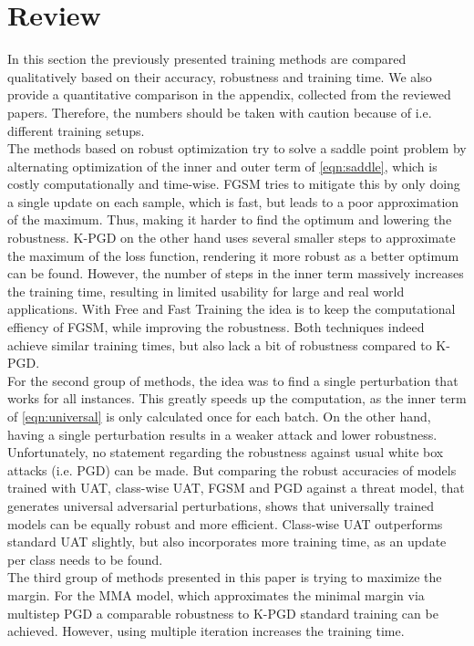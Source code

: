 \documentclass{article}
\begin{document}
\section{Review} \label{rev}
In this section the previously presented training methods are compared qualitatively based on their accuracy, robustness and training time. We also provide a quantitative comparison in the appendix, collected from the reviewed papers. Therefore, the numbers should be taken with caution because of i.e. different training setups. \\
The methods based on robust optimization try to solve a saddle point problem by alternating optimization of the inner and outer term of \ref{eqn:saddle}, which is costly computationally and time-wise. FGSM tries to mitigate this by only doing a single update on each sample, which is fast, but leads to a poor approximation of the maximum. Thus, making it harder to find the optimum and lowering the robustness. K-PGD on the other hand uses several smaller steps to approximate the maximum of the loss function, rendering it more robust as a better optimum can be found. However, the number of steps in the inner term massively increases the training time, resulting in limited usability for large and real world applications. With Free and Fast Training the idea is to keep the computational effiency of FGSM, while improving the robustness. Both techniques indeed achieve similar training times, but also lack a bit of robustness compared to K-PGD. \\
For the second group of methods, the idea was to find a single perturbation that works for all instances. This greatly speeds up the computation, as the inner term of \ref{eqn:universal} is only calculated once for each batch. On the other hand, having a single perturbation results in a weaker attack and lower robustness. Unfortunately, no statement regarding the robustness against usual white box attacks (i.e. PGD) can be made. But comparing the robust accuracies of models trained with UAT, class-wise UAT, FGSM and PGD against a threat model, that generates universal adversarial perturbations, shows that universally trained models can be equally robust and more efficient. Class-wise UAT outperforms standard UAT slightly, but also incorporates more training time, as an update per class needs to be found. \\
The third group of methods presented in this paper is trying to maximize the margin. For the MMA model, which approximates the minimal margin via multistep PGD a comparable robustness to K-PGD standard training can be achieved. However, using multiple iteration increases the training time.
  
\end{document}
